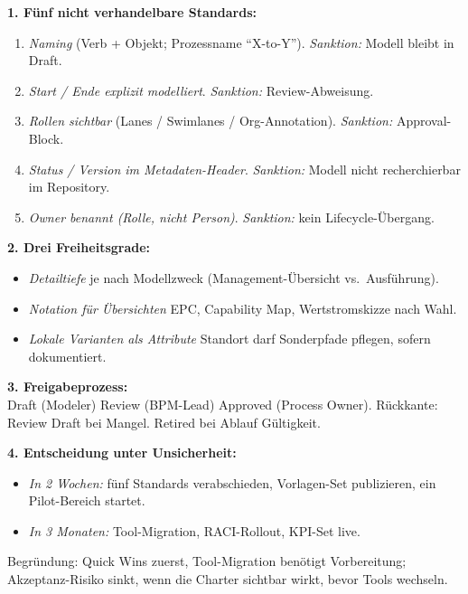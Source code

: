 \documentclass[11pt,a4paper,oneside]{article}
\begin{document}
\begin{loesungbox}
\textbf{1. F\"unf nicht verhandelbare Standards:}
\begin{enumerate}
  \item \emph{Naming} (Verb + Objekt; Prozessname ``X-to-Y''). \emph{Sanktion:} Modell bleibt in Draft.
  \item \emph{Start / Ende explizit modelliert}. \emph{Sanktion:} Review-Abweisung.
  \item \emph{Rollen sichtbar} (Lanes / Swimlanes / Org-Annotation). \emph{Sanktion:} Approval-Block.
  \item \emph{Status / Version im Metadaten-Header}. \emph{Sanktion:} Modell nicht recherchierbar im Repository.
  \item \emph{Owner benannt (Rolle, nicht Person)}. \emph{Sanktion:} kein Lifecycle-\"Ubergang.
\end{enumerate}

\smallskip
\textbf{2. Drei Freiheitsgrade:}
\begin{itemize}
  \item \emph{Detailtiefe} \textendash{} je nach Modellzweck (Management-\"Ubersicht vs.\ Ausf\"uhrung).
  \item \emph{Notation f\"ur \"Ubersichten} \textendash{} EPC, Capability Map, Wertstromskizze nach Wahl.
  \item \emph{Lokale Varianten als Attribute} \textendash{} Standort darf Sonderpfade pflegen, sofern dokumentiert.
\end{itemize}

\smallskip
\textbf{3. Freigabeprozess:}\\
Draft (Modeler) \textrightarrow{} Review (BPM-Lead) \textrightarrow{} Approved (Process Owner). R\"uckkante: Review \textrightarrow{} Draft bei Mangel. Retired bei Ablauf G\"ultigkeit.

\smallskip
\textbf{4. Entscheidung unter Unsicherheit:}
\begin{itemize}
  \item \emph{In 2 Wochen:} f\"unf Standards verabschieden, Vorlagen-Set publizieren, ein Pilot-Bereich startet.
  \item \emph{In 3 Monaten:} Tool-Migration, RACI-Rollout, KPI-Set live.
\end{itemize}
Begr\"undung: Quick Wins zuerst, Tool-Migration ben\"otigt Vorbereitung; Akzeptanz-Risiko sinkt, wenn die Charter sichtbar wirkt, bevor Tools wechseln.
\end{loesungbox}

\clearpage
\end{document}
